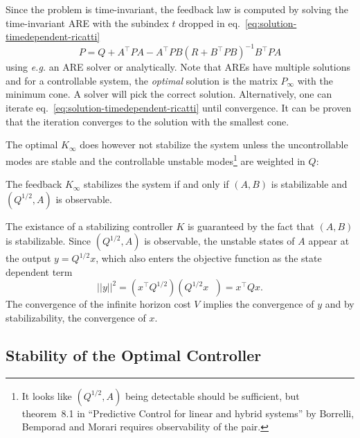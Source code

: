 Since the problem is time-invariant, the feedback law is computed by solving the time-invariant ARE with the subindex $t$ dropped in eq.~\eqref{eq:solution-timedependent-ricatti}
\begin{equation*}
  P = Q + A^\top P A - A^\top P B\left(R + B^\top PB\right)^{-1}B^\top P A
\end{equation*}
using \textit{e.g.} an ARE solver or analytically. Note that AREs have multiple solutions and for a controllable system, the \emph{optimal} solution is the matrix $P_\infty$ with the minimum cone. A solver will pick the correct solution. Alternatively, one can iterate eq.~\eqref{eq:solution-timedependent-ricatti} until convergence. It can be proven that the iteration converges to the solution with the smallest cone.

The optimal $K_\infty$ does however not stabilize the system unless the uncontrollable modes are stable and the controllable unstable modes\footnote{It looks like $(Q^{1/2},A)$ being detectable should be sufficient, but theorem~8.1 in ``Predictive Control for linear and hybrid systems'' by Borrelli, Bemporad and Morari requires observability of the pair.} are weighted in $Q$:
\begin{theorem}
  The feedback $K_\infty$ stabilizes the system if and only if $(A,B)$ is stabilizable and $(Q^{1/2},A)$ is observable.
\end{theorem}
The existance of a stabilizing controller $K$ is guaranteed by the fact that $(A,B)$ is stabilizable. Since $(Q^{1/2},A)$ is observable, the unstable states of $A$ appear at the output $y=Q^{1/2}x$, which also enters the objective function as the state dependent term
\begin{equation*}
  ||y||^2 = \left(x^\top Q^{1/2}\right)\left(Q^{1/2} x^{\phantom{\top}}\right) = x^\top Qx.
\end{equation*}
The convergence of the infinite horizon cost $V$ implies the convergence of $y$ and by stabilizability, the convergence of $x$.


\subsection{Stability of the Optimal Controller}
\label{sec:stability-optimal-controller}

